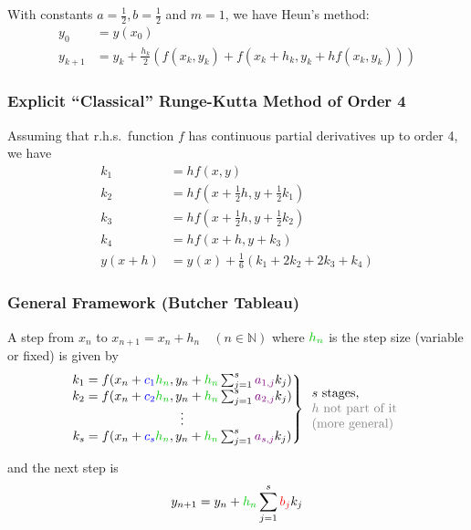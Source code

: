With constants $a=\frac{1}{2}, b=\frac{1}{2}$ and $m=1$, we have Heun's method:
\begin{align*}
    y_0 & = y(x_0) \\
    y_{k+1} & = y_k + \frac{h_k}{2}\left(f(x_k,y_k)+f(x_k+h_k,y_k+hf(x_k,y_k))\right)
\end{align*}

\subsubsection{Explicit ``Classical'' Runge-Kutta Method of Order 4}

Assuming that r.h.s.\ function $f$ has continuous partial derivatives up to order 4, we have
\begin{align*}
    k_1 & = hf(x,y) \\
    k_2 & = hf(x+\frac{1}{2}h, y+\frac{1}{2}k_1) \\
    k_3 & = hf(x+\frac{1}{2}h, y+\frac{1}{2}k_2) \\
    k_4 & = hf(x+h, y+k_3) \\
    y(x+h) & = y(x) + \frac{1}{6}(k_1+2k_2+2k_3+k_4)
\end{align*}

\subsubsection{General Framework (Butcher Tableau)}

\begin{snugshade*}
    A step from $x_n$ to $x_{n+1}=x_n+h_n\quad(n\in\mathbb{N})$ where ${\color{darkgreen}h_n}$ is the step size (variable or fixed)
    is given by
    \begin{align*}
        \left.
        \begin{matrix}
            k_{1}=f(x_n+{\color{blue}c_1}{\color{darkgreen}h_n},y_n+{\color{darkgreen}h_n}\sum_{j=1}^{s}{\color{purple}a_{1,j}}k_j) \\
            k_{2}=f(x_n+{\color{blue}c_2}{\color{darkgreen}h_n},y_n+{\color{darkgreen}h_n}\sum_{j=1}^{s}{\color{purple}a_{2,j}}k_j) \\
            \vdots                                                            \\
            k_{s}=f(x_n+{\color{blue}c_s}{\color{darkgreen}h_n},y_n+{\color{darkgreen}h_n}\sum_{j=1}^{s}{\color{purple}a_{s,j}}k_j)
        \end{matrix}
        \right\}
        \begin{array}{l}
            s \text{ stages, } \\
            {\color{gray} h\text{ not part of it}} \\
            {\color{gray} \text{(more general)}}
        \end{array}
    \end{align*}

    and the next step is
    \begin{align*}
        y_{n+1}=y_n+{\color{darkgreen}h_n}\sum_{j=1}^{s}{\color{red}b_j}k_j
    \end{align*}
\end{snugshade*}

